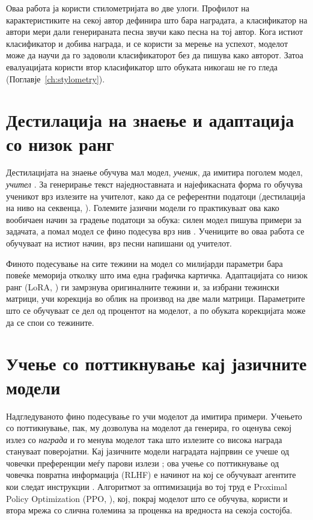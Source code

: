 Оваа работа ја користи стилометријата во две улоги. Профилот на
карактеристиките на секој автор дефинира што бара наградата, а
класификатор на автори мери дали генерираната песна звучи како
песна на тој автор. Кога истиот класификатор и добива награда, и се користи
за мерење на успехот, моделот може да научи да го задоволи
класификаторот без да пишува како авторот. Затоа евалуацијата користи втор
класификатор што обуката никогаш не го гледа
(Поглавје~\ref{ch:stylometry}).

\section{Дестилација на знаење и адаптација со низок ранг}

Дестилацијата на знаење обучува мал модел, \emph{ученик}, да имитира
поголем модел, \emph{учител} \citep{hinton2015distilling}. За генерирање
текст наједноставната и најефикасната форма го обучува ученикот врз
излезите на учителот, како да се референтни податоци (дестилација на ниво
на секвенца, \citealp{kim2016seqkd}). Големите јазични модели го практикуваат
ова како вообичаен начин за градење податоци за обука: силен модел пишува
примери за задачата, а помал модел се фино подесува врз нив
\citep{wang2023selfinstruct}. Учениците во оваа работа се обучуваат на
истиот начин, врз песни напишани од учителот.

Финото подесување на сите тежини на модел со милијарди параметри бара
повеќе меморија отколку што има една графичка картичка. Адаптацијата со
низок ранг (LoRA, \citealp{hu2022lora}) ги замрзнува оригиналните тежини
и, за избрани тежински матрици, учи корекција во облик на производ на две
мали матрици. Параметрите што се обучуваат се дел од процентот на
моделот, а по обуката корекцијата може да се спои со тежините.

\section{Учење со поттикнување кај јазичните модели}

Надгледуваното фино подесување го учи моделот да имитира примери.
Учењето со поттикнување, пак, му дозволува на моделот да генерира, го
оценува секој излез со \emph{награда} и го менува моделот така што
излезите со висока награда стануваат поверојатни. Кај јазичните модели
наградата најпрвин се учеше од човечки преференции меѓу парови излези
\citep{christiano2017deep, ziegler2019finetuning}; ова учење со
поттикнување од човечка повратна информација (RLHF) е начинот на кој се
обучуваат агентите кои следат инструкции \citep{ouyang2022instructgpt}.
Алгоритмот за оптимизација во тој труд е Proximal Policy Optimization
(PPO, \citealp{schulman2017ppo}), кој, покрај моделот што се обучува, користи
и втора мрежа со слична големина за проценка на вредноста на секоја
состојба.

